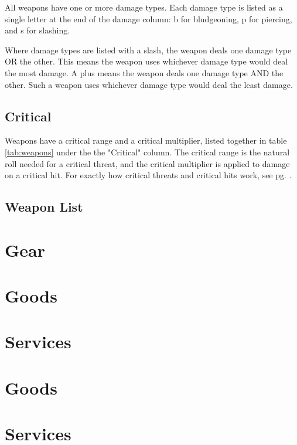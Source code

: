 \begin{multicols}{2}
    All weapons have one or more damage types. Each damage type is listed as
    a single letter at the end of the damage column: b for bludgeoning, p for
    piercing, and s for slashing.

    Where damage types are listed with a slash, the weapon deals one damage
    type OR the other. This means the weapon uses whichever damage type
    would deal the most damage. A plus means the weapon deals one damage
    type AND the other. Such a weapon uses whichever damage type would deal
    the least damage.

    \subsection{Critical}
    Weapons have a critical range and a critical multiplier, listed together
    in table \ref{tab:weapons} under the the "Critical" column. The critical
    range is the natural roll needed for a critical threat, and the critical
    multiplier is applied to damage on a critical hit. For exactly how critical
    threats and critical hits work, see pg. \pageref{combat:critical-hits}.

    \subsection{Weapon List}

    \section{Gear}

    \section{Goods}

    \section{Services}
\end{multicols}



\section{Goods}

\section{Services}
